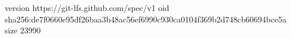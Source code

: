 version https://git-lfs.github.com/spec/v1
oid sha256:de7f0660e95df26baa3b48ac56ef6990c930ca0104f369b2d748cb60694bce5a
size 23990
